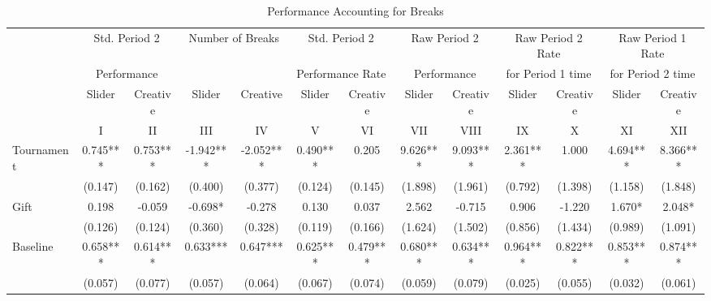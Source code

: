 \begin{landscape}
\begin{table}[h]%
\setlength\tabcolsep{2pt}
\caption{Performance Accounting for Breaks}
\begin{center}%
{\small\renewcommand{\arraystretch}{1}%
\begin{tabular}{lcccccccccccc}
\hline\hline\noalign{\smallskip}
 \multicolumn{1}{c}{} & \multicolumn{2}{c}{Std. Period 2} & \multicolumn{2}{c}{Number of Breaks} & \multicolumn{2}{c}{Std. Period 2} & \multicolumn{2}{c}{Raw Period 2} & \multicolumn{2}{c}{Raw Period 2 Rate} & \multicolumn{2}{c}{Raw Period 1 Rate}\\
 & \multicolumn{2}{c}{Performance} & & & \multicolumn{2}{c}{Performance Rate} & \multicolumn{2}{c}{Performance} & \multicolumn{2}{c}{for Period 1 time} & \multicolumn{2}{c}{for Period 2 time} \\
\hline
 & Slider & Creative & Slider & Creative & Slider & Creative & Slider & Creative & Slider & Creative & Slider & Creative \\
 & I & II & III & IV & V & VI & VII & VIII & IX & X & XI & XII \\
\hline
Tournament          &       0.745***&       0.753***&      -1.942***&      -2.052***&       0.490***&       0.205   &       9.626***&       9.093***&       2.361***&       1.000   &       4.694***&       8.366***\\
                    &     (0.147)   &     (0.162)   &     (0.400)   &     (0.377)   &     (0.124)   &     (0.145)   &     (1.898)   &     (1.961)   &     (0.792)   &     (1.398)   &     (1.158)   &     (1.848)   \\
Gift                &       0.198   &      -0.059   &      -0.698*  &      -0.278   &       0.130   &       0.037   &       2.562   &      -0.715   &       0.906   &      -1.220   &       1.670*  &       2.048*  \\
                    &     (0.126)   &     (0.124)   &     (0.360)   &     (0.328)   &     (0.119)   &     (0.166)   &     (1.624)   &     (1.502)   &     (0.856)   &     (1.434)   &     (0.989)   &     (1.091)   \\
Baseline            &       0.658***&       0.614***&       0.633***&       0.647***&       0.625***&       0.479***&       0.680***&       0.634***&       0.964***&       0.822***&       0.853***&       0.874***\\
                    &     (0.057)   &     (0.077)   &     (0.057)   &     (0.064)   &     (0.067)   &     (0.074)   &     (0.059)   &     (0.079)   &     (0.025)   &     (0.055)   &     (0.032)   &     (0.061)   \\

\end{tabular}}
\end{center}
\end{table}
\end{landscape}
